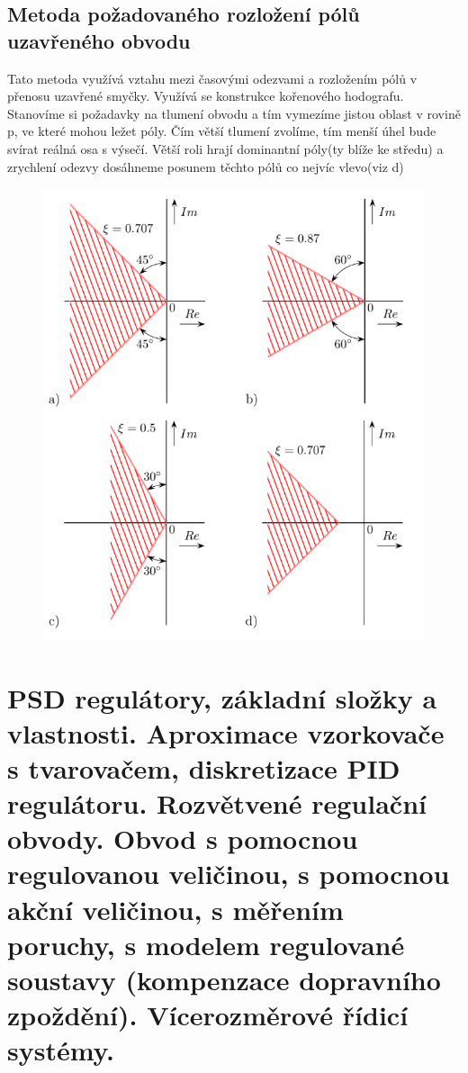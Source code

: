 \subsection*{Metoda požadovaného rozložení pólů uzavřeného obvodu}
Tato metoda využívá vztahu mezi časovými odezvami a rozložením pólů v přenosu uzavřené smyčky. Využívá se konstrukce kořenového hodografu.\\
Stanovíme si požadavky na tlumení obvodu a tím vymezíme jistou oblast v rovině p, ve které mohou ležet póly.
Čím větší tlumení zvolíme, tím menší úhel bude svírat reálná osa s výsečí. Větší roli hrají dominantní póly(ty blíže ke středu) a zrychlení odezvy dosáhneme posunem těchto pólů co nejvíc vlevo(viz d)\\
\begin{figure}[H]
    \includegraphics*[scale = 1]{images/metodaRozlozeniPolu.png}
\end{figure}


\newpage


\section{PSD regulátory, základní složky a vlastnosti. Aproximace vzorkovače s tvarovačem, diskretizace PID regulátoru.
  Rozvětvené regulační obvody. Obvod s pomocnou regulovanou veličinou, s pomocnou akční veličinou, s měřením
  poruchy, s modelem regulované soustavy (kompenzace dopravního zpoždění). Vícerozměrové řídicí systémy.}

